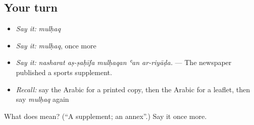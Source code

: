 \subsection*{Your turn}
\begin{itemize}
\raggedright
  \item \emph{Say it:} \emph{mulḥaq}
  \item \emph{Say it:} \emph{mulḥaq}, once more
  \item \emph{Say it:} \emph{nasharat aṣ-ṣaḥīfa mulḥaqan ʿan ar-riyāḍa.} — The newspaper published a sports supplement.
  \item \emph{Recall:} say the Arabic for a printed copy, then the Arabic for a leaflet, then say \emph{mulḥaq} again
\end{itemize}

\begin{tcolorbox}[breakable,colback=teal!4,colframe=teal!35!black,title={Before you move on}]
What does  mean? (\textquotedblleft{}A supplement; an annex\textquotedblright{}.) Say it once more.
\end{tcolorbox}

